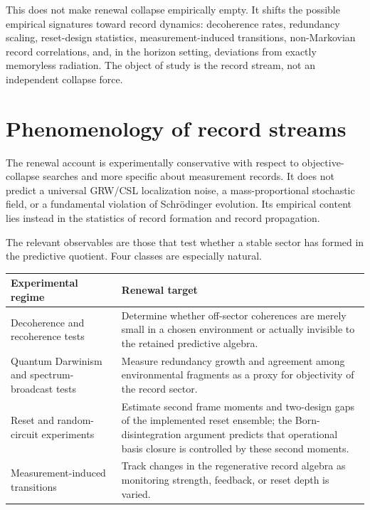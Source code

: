 \documentclass[11pt]{article}
\numberwithin{equation}{section}
\theoremstyle{definition}
\theoremstyle{remark}
\begin{document}
This does not make renewal collapse empirically empty.  It shifts the possible empirical signatures toward record dynamics: decoherence rates, redundancy scaling, reset-design statistics, measurement-induced transitions, non-Markovian record correlations, and, in the horizon setting, deviations from exactly memoryless radiation.  The object of study is the record stream, not an independent collapse force.

\section{Phenomenology of record streams}
\label{sec:phenomenology}

The renewal account is experimentally conservative with respect to objective-collapse searches and more specific about measurement records.  It does not predict a universal GRW/CSL localization noise, a mass-proportional stochastic field, or a fundamental violation of Schr\"odinger evolution.  Its empirical content lies instead in the statistics of record formation and record propagation.

The relevant observables are those that test whether a stable sector has formed in the predictive quotient.  Four classes are especially natural.

\begin{center}
\small
\renewcommand{\arraystretch}{1.14}
\begin{tabularx}{\textwidth}{@{}p{}X@{}}
\toprule
\textbf{Experimental regime} & \textbf{Renewal target}\\
\midrule
Decoherence and recoherence tests & Determine whether off-sector coherences are merely small in a chosen environment or actually invisible to the retained predictive algebra.\\
Quantum Darwinism and spectrum-broadcast tests & Measure redundancy growth and agreement among environmental fragments as a proxy for objectivity of the record sector.\\
Reset and random-circuit experiments & Estimate second frame moments and two-design gaps of the implemented reset ensemble; the Born-disintegration argument predicts that operational basis closure is controlled by these second moments.\\
Measurement-induced transitions & Track changes in the regenerative record algebra as monitoring strength, feedback, or reset depth is varied.\\
\bottomrule
\end{tabularx}
\end{center}
\end{document}
